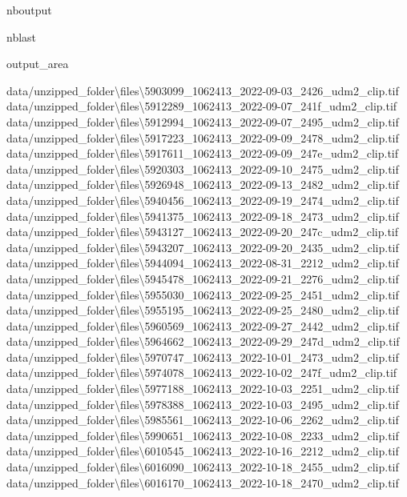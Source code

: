 \documentclass[letterpaper,10pt]{sphinxmanual}
\begin{document}
\begin{sphinxuseclass}{nboutput}
\begin{sphinxuseclass}{nblast}
{\begin{sphinxuseclass}{output_area}
\begin{sphinxuseclass}{}
\begin{sphinxVerbatim}[commandchars=\\\{\}]
data/unzipped\_folder\textbackslash{}files\textbackslash{}5903099\_1062413\_2022-09-03\_2426\_udm2\_clip.tif
data/unzipped\_folder\textbackslash{}files\textbackslash{}5912289\_1062413\_2022-09-07\_241f\_udm2\_clip.tif
data/unzipped\_folder\textbackslash{}files\textbackslash{}5912994\_1062413\_2022-09-07\_2495\_udm2\_clip.tif
data/unzipped\_folder\textbackslash{}files\textbackslash{}5917223\_1062413\_2022-09-09\_2478\_udm2\_clip.tif
data/unzipped\_folder\textbackslash{}files\textbackslash{}5917611\_1062413\_2022-09-09\_247e\_udm2\_clip.tif
data/unzipped\_folder\textbackslash{}files\textbackslash{}5920303\_1062413\_2022-09-10\_2475\_udm2\_clip.tif
data/unzipped\_folder\textbackslash{}files\textbackslash{}5926948\_1062413\_2022-09-13\_2482\_udm2\_clip.tif
data/unzipped\_folder\textbackslash{}files\textbackslash{}5940456\_1062413\_2022-09-19\_2474\_udm2\_clip.tif
data/unzipped\_folder\textbackslash{}files\textbackslash{}5941375\_1062413\_2022-09-18\_2473\_udm2\_clip.tif
data/unzipped\_folder\textbackslash{}files\textbackslash{}5943127\_1062413\_2022-09-20\_247c\_udm2\_clip.tif
data/unzipped\_folder\textbackslash{}files\textbackslash{}5943207\_1062413\_2022-09-20\_2435\_udm2\_clip.tif
data/unzipped\_folder\textbackslash{}files\textbackslash{}5944094\_1062413\_2022-08-31\_2212\_udm2\_clip.tif
data/unzipped\_folder\textbackslash{}files\textbackslash{}5945478\_1062413\_2022-09-21\_2276\_udm2\_clip.tif
data/unzipped\_folder\textbackslash{}files\textbackslash{}5955030\_1062413\_2022-09-25\_2451\_udm2\_clip.tif
data/unzipped\_folder\textbackslash{}files\textbackslash{}5955195\_1062413\_2022-09-25\_2480\_udm2\_clip.tif
data/unzipped\_folder\textbackslash{}files\textbackslash{}5960569\_1062413\_2022-09-27\_2442\_udm2\_clip.tif
data/unzipped\_folder\textbackslash{}files\textbackslash{}5964662\_1062413\_2022-09-29\_247d\_udm2\_clip.tif
data/unzipped\_folder\textbackslash{}files\textbackslash{}5970747\_1062413\_2022-10-01\_2473\_udm2\_clip.tif
data/unzipped\_folder\textbackslash{}files\textbackslash{}5974078\_1062413\_2022-10-02\_247f\_udm2\_clip.tif
data/unzipped\_folder\textbackslash{}files\textbackslash{}5977188\_1062413\_2022-10-03\_2251\_udm2\_clip.tif
data/unzipped\_folder\textbackslash{}files\textbackslash{}5978388\_1062413\_2022-10-03\_2495\_udm2\_clip.tif
data/unzipped\_folder\textbackslash{}files\textbackslash{}5985561\_1062413\_2022-10-06\_2262\_udm2\_clip.tif
data/unzipped\_folder\textbackslash{}files\textbackslash{}5990651\_1062413\_2022-10-08\_2233\_udm2\_clip.tif
data/unzipped\_folder\textbackslash{}files\textbackslash{}6010545\_1062413\_2022-10-16\_2212\_udm2\_clip.tif
data/unzipped\_folder\textbackslash{}files\textbackslash{}6016090\_1062413\_2022-10-18\_2455\_udm2\_clip.tif
data/unzipped\_folder\textbackslash{}files\textbackslash{}6016170\_1062413\_2022-10-18\_2470\_udm2\_clip.tif
\end{sphinxVerbatim}




\end{sphinxuseclass}
\end{sphinxuseclass}}
\end{sphinxuseclass}
\end{sphinxuseclass}
\end{document}
